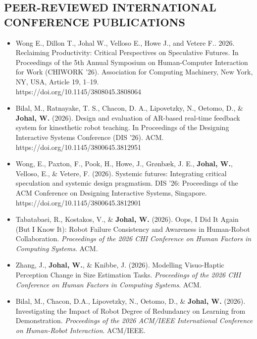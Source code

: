 \vspace{0.1in}

\subsection{PEER-REVIEWED INTERNATIONAL CONFERENCE PUBLICATIONS}
\vspace{2pt}

\begin{itemize}[nosep]
    \renewcommand\labelitemi{$\bullet$}
\item Wong E., Dillon T., Johal W., Velloso E., Howe J., and Vetere F.. 2026. Reclaiming Productivity: Critical Perspectives on Speculative Futures. In Proceedings of the 5th Annual Symposium on Human-Computer Interaction for Work (CHIWORK '26). Association for Computing Machinery, New York, NY, USA, Article 19, 1–19. \\https://doi.org/10.1145/3808045.3808064

  \item Bilal, M., Ratnayake, T. S., Chacon, D. A., Lipovetzky, N., Oetomo, D., \& \textbf{Johal, W.} (2026). Design and evaluation of AR-based real-time feedback system for kinesthetic robot teaching. In Proceedings of the Designing Interactive Systems Conference (DIS '26). ACM. https://doi.org/10.1145/3800645.3812951 \faMedal

    \item Wong, E., Paxton, F., Pook, H., Howe, J., Grønbæk, J. E., \textbf{Johal, W.}, Velloso, E., \& Vetere, F. (2026). Systemic futures: Integrating critical speculation and systemic design pragmatism. DIS '26: Proceedings of the ACM Conference on Designing Interactive Systems, Singapore. https://doi.org/10.1145/3800645.3812901 \faMedal

    \item Tabatabaei, R., Kostakos, V., \& \textbf{Johal, W.} (2026). Oops, I Did It Again (But I Know It): Robot Failure Consistency and Awareness in Human-Robot Collaboration. \textit{Proceedings of the 2026 CHI Conference on Human Factors in Computing Systems}. ACM. \faMedal

    \item Zhang, J., \textbf{Johal, W.}, \& Knibbe, J. (2026). Modelling Visuo-Haptic Perception Change in Size Estimation Tasks. \textit{Proceedings of the 2026 CHI Conference on Human Factors in Computing Systems}. ACM.

    \item Bilal, M., Chacon, D.A., Lipovetzky, N., Oetomo, D., \& \textbf{Johal, W.} (2026). Investigating the Impact of Robot Degree of Redundancy on Learning from Demonstration. \textit{Proceedings of the 2026 ACM/IEEE International Conference on Human-Robot Interaction}. ACM/IEEE.


\end{itemize}
